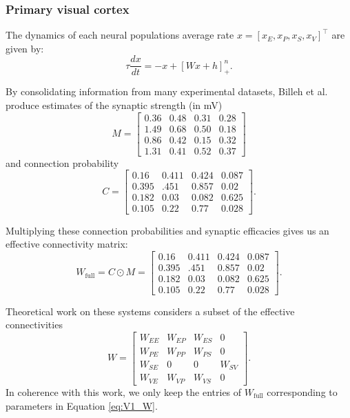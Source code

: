 \documentclass[11pt]{article}
\begin{document}
\subsubsection{Primary visual cortex}\label{methods_V1}
The dynamics of each neural populations average rate
$x = [ x_E, x_P, x_S, x_V]^\top$
are given by:
\begin{equation}
\tau \frac{dx}{dt} = -x + [W x+ h]_+^n.
\end{equation}

By consolidating information from many experimental datasets, Billeh et al. \cite{billeh2019systematic} produce estimates of the synaptic strength (in mV)
\begin{equation}
M = \begin{bmatrix} 0.36 & 0.48 & 0.31 & 0.28 \\
1.49 & 0.68 & 0.50 & 0.18 \\
0.86 & 0.42 & 0.15 & 0.32 \\
1.31 & 0.41 & 0.52 & 0.37 \end{bmatrix}
\end{equation}
and connection probability
\begin{equation}
C = \begin{bmatrix} 0.16 & 0.411 & 0.424 &  0.087 \\
0.395 & .451 & 0.857 & 0.02 \\
0.182 & 0.03 & 0.082 & 0.625 \\
0.105 & 0.22 & 0.77 & 0.028 \end{bmatrix}.
\end{equation}

Multiplying these connection probabilities and synaptic efficacies gives us an effective connectivity matrix:
\begin{equation}
W_{\text{full}} = C \odot M = \begin{bmatrix} 0.16 & 0.411 & 0.424 &  0.087 \\
0.395 & .451 & 0.857 & 0.02 \\
0.182 & 0.03 & 0.082 & 0.625 \\
0.105 & 0.22 & 0.77 & 0.028 \end{bmatrix}.
\end{equation}

Theoretical work on these systems considers a subset of the effective connectivities \cite{litwin2016inhibitory, GarciaDelMolino2017, Chen2019}
\begin{equation} \label{eq:V1_W}
W = \begin{bmatrix} W_{EE} & W_{EP} & W_{ES} & 0 \\
                                W_{PE} & W_{PP} & W_{PS} & 0 \\
                                W_{SE} & 0 & 0 & W_{SV} \\
                                W_{VE} & W_{VP} &  W_{VS} &  0 \end{bmatrix}.
\end{equation}
In coherence with this work, we only keep the entries of $W_{\text{full}}$ corresponding to parameters in Equation \ref{eq:V1_W}.
\end{document}
